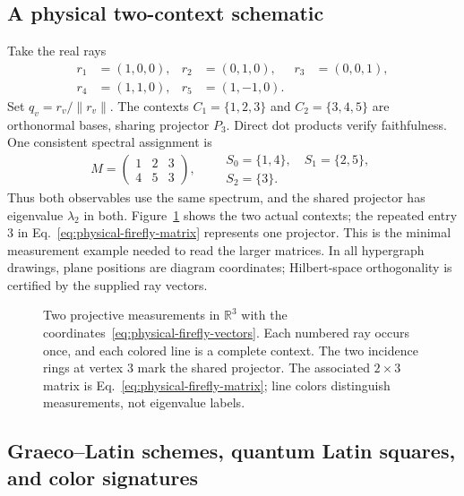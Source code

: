 \documentclass[aps,pra,reprint,superscriptaddress,longbibliography,nofootinbib,floatfix,10pt]{revtex4-2}
\theoremstyle{definition}\newtheorem{definition}[theorem]{Definition}
\theoremstyle{remark}\newtheorem{remark}[theorem]{Remark}
\begin{document}
\subsection{A physical two-context schematic}\label{sec:L12}
Take the real rays
\begin{equation}\label{eq:physical-firefly-vectors}
\begin{aligned}
r_1&=(1,0,0),&r_2&=(0,1,0),&r_3&=(0,0,1),\\
r_4&=(1,1,0),&r_5&=(1,-1,0).
\end{aligned}
\end{equation}
Set $q_v=r_v/\|r_v\|$. The contexts $C_1=\{1,2,3\}$ and $C_2=\{3,4,5\}$ are orthonormal bases, sharing projector $P_3$. Direct dot products verify faithfulness. One consistent spectral assignment is
\begin{equation}\label{eq:physical-firefly-matrix}
M=\begin{pmatrix}1&2&3\\4&5&3\end{pmatrix},\qquad
\begin{gathered}
S_0=\{1,4\},\quad S_1=\{2,5\},\\S_2=\{3\}.
\end{gathered}
\end{equation}
Thus both observables use the same spectrum, and the shared projector has eigenvalue $\lambda_2$ in both. Figure~\ref{fig:matrix-reading} shows the two actual contexts; the repeated entry $3$ in Eq.~\eqref{eq:physical-firefly-matrix} represents one projector. This is the minimal measurement example needed to read the larger matrices. In all hypergraph drawings, plane positions are diagram coordinates; Hilbert-space orthogonality is certified by the supplied ray vectors.
\begin{figure}[!tbp]
\centering

\caption{Two projective measurements in $\mathbb R^3$ with the coordinates~\eqref{eq:physical-firefly-vectors}. Each numbered ray occurs once, and each colored line is a complete context. The two incidence rings at vertex $3$ mark the shared projector. The associated $2\times3$ matrix is Eq.~\eqref{eq:physical-firefly-matrix}; line colors distinguish measurements, not eigenvalue labels.}\label{fig:matrix-reading}
\end{figure}

\subsection{Graeco--Latin schemes, quantum Latin squares, and color signatures}\label{sec:row-col}\label{sec:graeco-latin}
\end{document}
